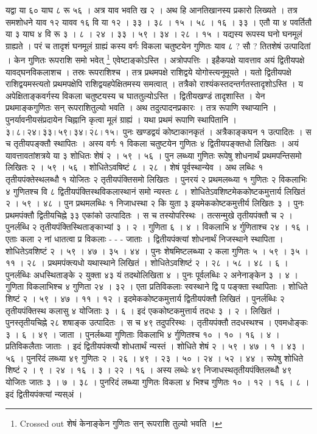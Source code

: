 \documentclass[11pt,a5paper]{book}
\begin{document}
\newpage
{\s यद्वा या ६० याघ ८ रू ५६ । अत्र याव भवति ख २ । 
अथ हि आनतिखानस्य प्रकारो लिख्यते । तत्र समशोधने याव १२ यावव १६ वि या १२ । ३३ । ३८ । १५ । ५८ । १६ । ३३ । 
एतौ या ४ पवर्तितौ या ३ याघ ४ वि रू ३ । ८ । २४ । ३३ । ५९ । ३४ । २८ । १५ । 
यद्यस्य रूपस्य घनो घनमूलं ग्राह्यते । परं च तादृशं घनमूलं ग्राह्यं कस्य वर्गः विकला चतुष्टयेन गुणितः याव ८ ? सौ ? 
तितशेषं उत्पादितां । केन गुणितः रूपराशि समो भवेत् \footnote{Crossed out शेषं केनाङ्केन गुणितः सन् रूपराशि तुल्यो भवति ।} 
एवेष्टाङ्कोऽस्ति । अत्रोपपत्तिः । इहैकपक्षे यावत्ताव अयं द्वितीयपक्षे यावद्घनविकलाशच । 
तस्रः रूपराशिश्च । तत्र प्रथमपक्षे राशिद्वये योगोस्त्यनूमूयते । यतो द्वितीयपक्षे राशिद्वयमस्त्यतो प्रथमपक्षेपि राशिद्वयहपेक्षितमस्य समत्वात् । 
तत्रैको राश्यंकस्तदन्तर्गतस्तादृशोऽस्ति । य अपेक्षिताङ्कवर्गस्य विकला चतुष्टयस्य च घाततुल्योऽस्ति । 
द्वितीयखण्डं तादृशास्ति । येन प्रथमाङ्कगुणितः सन् रूपराशितुल्यो भवति । 
अथ तदुत्पादनप्रकारः । तत्र रूपाणि स्थाप्यानि । पुनर्यावनीयसंप्रदायेन चिह्नानि कृत्वा मूलं ग्राह्यं । 
यथा प्रथमं रूपाणि स्थापितानि । $\dot{३} । ८ । २४ । \dot{३३} । ५९ । ३४ । \dot{२८} । १५ ।$ 
पुनः खण्डद्वयं कोष्टाकानकृतं । अत्रैकाङ्कघन १ उत्पादितः । स च तृतीयपङ्क्तौ स्थापितः । 
अस्य वर्गः १ विकला चतुष्टयेन गुणितः ४ द्वितीयपङ्क्तधो लिखितः । 
अयं यावत्तावतांशत्रये या ३ शोधितः शेषं २ । ५९ । ५६ । 
पुन लब्ध्या गुणितः रूपेषु शोधनार्थं प्रथमपन्तिसमो लिखितः २ । ५९ । ५६ । 
शोधितेऽवषिष्टं ८ । २८ । शेषं पूर्वस्थान्येव । अथ लब्धिः १ तृतीयपंक्तेस्थलब्धौ १ योजितः २ तृतीयपंक्तिसमो लिखितः । 
पुनरयं २ प्रथमलब्ध्या १ गुणितः २ विकलाभिः ४ गुणितश्च  वि ८ द्वितीयपंक्तिस्थविकलास्थानं समो न्यस्तः ८ । 
शोधितेऽवशिष्टमेककोष्टकमुत्तार्य लिखितं २ । ५९ । ४८ । पुन प्रथमलब्धिः १ निजाधस्था २ कि युता ३ इयमेककोष्टकमुत्तीर्य लिखितः ३ । 
पुनः प्रथमपंक्तौ द्वितीयचिह्ने ३३ एकांको उत्पादितः । स च तस्योपरिस्थः । तत्सन्मुखे तृतीयपंक्तौ च २ । 
पुनर्लब्धि २ तृतीयपंक्तिस्थिताङ्काभ्यां ३ । २ । गुणिता ६ । ४ । विकलाभि ४ र्गुणिताश्च २४ । १६ । 
एताः कला २ नां धातत्वा प्र विकलाः - - - जाताः । द्वितीयपंक्त्यां शोधनार्थं निजस्थाने स्थापिता । 
शोधितेऽवशिष्टं २ । ५९ । ४७ । ३५ । ४४ । पुनः शेषमिष्टलब्ध्या २ कला गुणितः ५ । ५९ । ३५ । ११ । २८ । 
प्रथमपंक्त्यधो यथास्थाने लिखितं । शोधितेऽवशिष्टं २ । २८ । ५८ । ४८ । ६ । 
पुनर्लब्धिः अधस्थिताङ्के २ युक्ता ४३ यं तदथोलिखिता ४ । पुनः पूर्वलब्धिः २ अनेनाङ्केन ३ । ४ । 
गुणिता विकलाभिश्च ४ गुणिता २४ । ३२ । एता प्रतिविकलाः स्वस्थाने द्वि प पङ्क्ता स्थापिताः । 
शोधिते शिष्टं २ । ५९ । ४७ । ११ । १२ । इदमेककोष्टकमुत्तार्य द्वितीयपंक्तौ लिखितं । 
पुनर्लब्धिः २ तृतीयपंक्तिस्थ कलासु ४ योजिताः ३ । ६ । इदं एककोष्टकमुत्तार्य तदधः ३ । २ । 
लिखितं । पुनस्तृतीयचिह्ने २८ शषाङ्क उत्पादितः । स च ४९ तदुपरिस्थः । 
तृतीयपंक्तौ तदधस्थश्च । एवमधोङ्कः ३ । ६ । ४९ । जाता । पुनर्लब्ध्या गुणिताः विकलाभि ४ र्गुणितश्च १० । १० । १६ । ४ । 
प्रतिविकलैताः जाताः । इदं द्वितीयपंक्त्यौ शोधतार्थं न्यस्तं । शोधिते शेषं २ । ५९ । ४७ । १ । ४३ । ५६ । 
पुनरिदं लब्ध्या ४९ गुणितः २ । २६ । ४९ । २३ । ५० । २४ । ५२ । ४४ । 
रूपेषु शोधिते शिष्टं २ । ९ । २४ । १६ । ३ । २२ । १६ । अस्य लब्धेः ४९ निजाधस्थतृतीयपंक्तिलब्धौ ४९ योजितः जातः ३ । ७ । ३८ । 
पुनरिदं लब्ध्या गुणितः विकला ४ भिश्च गुणितः १० । १२ । १६ । ८ । इदं द्वितीयपंक्त्यां न्यस्अं । 




}
\end{document}
